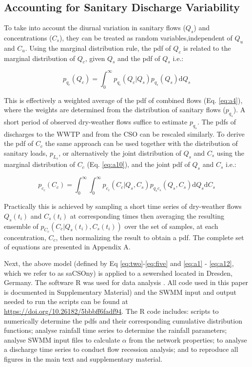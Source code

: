 \documentclass{agujournal2018}
\begin{document}
\subsection{Accounting for Sanitary Discharge Variability}
To take into account the diurnal variation in sanitary flows ($Q_s$) and concentrations ($C_s$), they can be treated as random variables,independent of $Q_u$ and $C_u$. Using the marginal distribution rule, the pdf of $Q_c$ is related to the marginal distribution of $Q_c$, given $Q_s$ and the pdf of $Q_s$ i.e.:
\begin{linenomath*}
\begin{equation}
p_{q_c}\left(Q_c\right) = \int_{0}^{\infty} p_{q_c} \left(Q_c | Q_s\right) p_{q_s}\left(Q_s\right)\mathrm{d} Q_s
\label{eq:four}
\end{equation}
\end{linenomath*}
This is ef\/fectively a weighted average of the pdf of combined f\/lows (Eq. \ref{eq:a4}), where the weights are determined from the distribution of sanitary f\/lows ($p_{q_s}$). A short period of observed dry-weather f\/lows suf\/f\/ice to estimate $p_{q_s}$. The pdfs of discharges to the WWTP and from the CSO can be rescaled similarly. To derive the pdf of $C_c$ the same approach can be used together with the distribution of sanitary loads, $p_{L_s}$, or alternatively the joint distribution of $Q_s$ and $C_s$ using the marginal distribution of $C_c$ (Eq. \ref{eq:a10}), and the joint pdf of $Q_s$ and $C_s$ i.e.: 
\begin{linenomath*}
\begin{equation}
p_{c_c}\left(C_c\right) = \int_{0}^{\infty}\int_{0}^{\infty}p_{c_c}\left(C_c | Q_s ,C_s\right) p_{q_s c_s}\left(Q_s ,C_s\right) \mathrm{d}Q_s \mathrm{d}C_s
\label{eq:five}
\end{equation}
\end{linenomath*}
Practically this is achieved by sampling a short time series of dry-weather f\/lows $Q_{s}(t_i)$ and $C_{s}(t_i)$ at corresponding times then averaging the resulting ensemble of $p_{C_c}\left(C_c  | Q_s(t_i),C_s(t_i)\right)$ over the set of samples, at each concentration, $C_c$, then normalizing the result to obtain a pdf. The complete set of equations are presented in Appendix A. 

Next, the above model (defined by Eq \ref{eq:two}-\ref{eq:five} and \ref{eq:a1} - \ref{eq:a12}, which we refer to as saCSOny) is applied to a sewershed located in Dresden, Germany. The software R was used for data analysis \citep{RCore}. All code used in this paper is documented in Supplementary Material) and the SWMM input and output needed to run the scripts can be found at \url{https://doi.org/10.26182/5bbbff6fadf94}. The R code includes: scripts to numerically determine the pdfs and their corresponding cumulative distribution functions; analyse rainfall time series to determine the rainfall parameters; analyse SWMM input files to calculate $\alpha$ from the network properties; to analyse a discharge time series to conduct flow recession analysis; and to reproduce all figures in the main text and supplementary material.
\end{document}
